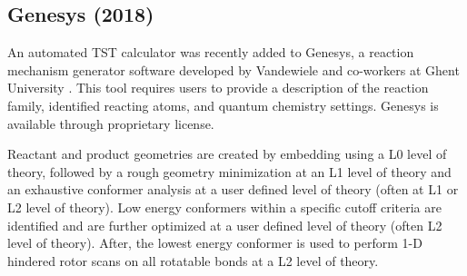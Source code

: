 \documentclass[preprint, 11pt]{elsarticle} %
\begin{document}

\subsection{Genesys (2018)}

An automated TST calculator was recently added to Genesys, a reaction mechanism generator software developed by Vandewiele and co-workers at Ghent University \cite{VANDEVIJVER:2018, vandewiele:2012}. 
This tool requires users to provide a description of the reaction family, identified reacting atoms, and quantum chemistry settings.
Genesys is available through proprietary license.

Reactant and product geometries are created by embedding using a L0 level of theory, followed by a rough geometry minimization at an L1 level of theory and an exhaustive conformer analysis at a user defined level of theory (often at L1 or L2 level of theory).
Low energy conformers within a specific cutoff criteria are identified and are further optimized at a user defined level of theory (often L2 level of theory).
After, the lowest energy conformer is used to perform 1-D hindered rotor scans on all rotatable bonds at a L2 level of theory.
\end{document}
